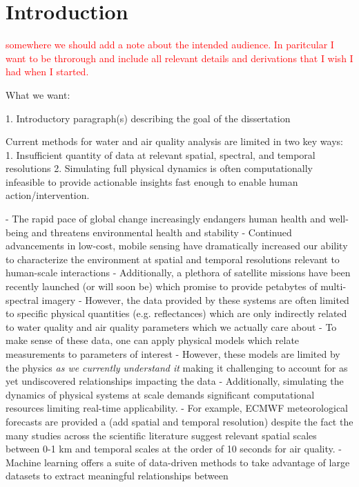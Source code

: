 \chapter{Introduction}\label{ch:intro}


\textcolor{red}{somewhere we should add a note about the intended audience. In paritcular I want to be throrough and include all relevant details and derivations that I wish I had when I started.}



What we want:

1. Introductory paragraph(s) describing the goal of the dissertation

Current methods for water and air quality analysis are limited in two key ways:
1. Insufficient quantity of data at relevant spatial, spectral, and temporal
resolutions
2. Simulating full physical dynamics is often computationally infeasible to
provide actionable insights fast enough to enable human action/intervention.



- The rapid pace of global change increasingly endangers human health and well-being
and threatens environmental health and stability
- Continued advancements in low-cost, mobile sensing have dramatically increased
our ability to characterize the environment at spatial and temporal resolutions
relevant to human-scale interactions
- Additionally, a plethora of satellite missions have been recently launched (or
will soon be) which promise to provide petabytes of multi-spectral imagery
- However, the data provided by these systems are often limited to specific
physical quantities (e.g. reflectances) which are only indirectly related to water quality and air
quality parameters which we actually care about
- To make sense of these data, one can apply physical models which relate
measurements to parameters of interest
- However, these models are limited by the physics \textit{as we currently
  understand it} making it challenging to account for as yet undiscovered
relationships impacting the data 
- Additionally, simulating the dynamics of physical systems at scale demands 
significant computational resources limiting real-time applicability.
- For example, ECMWF meteorological forecasts are provided a (add spatial and
temporal resolution) despite the fact the many studies across the scientific
literature suggest relevant spatial scales between 0-1 km and temporal scales at
the order of 10 seconds for air quality.
- Machine learning offers a suite of data-driven methods to take advantage of
large datasets to extract meaningful relationships between 


